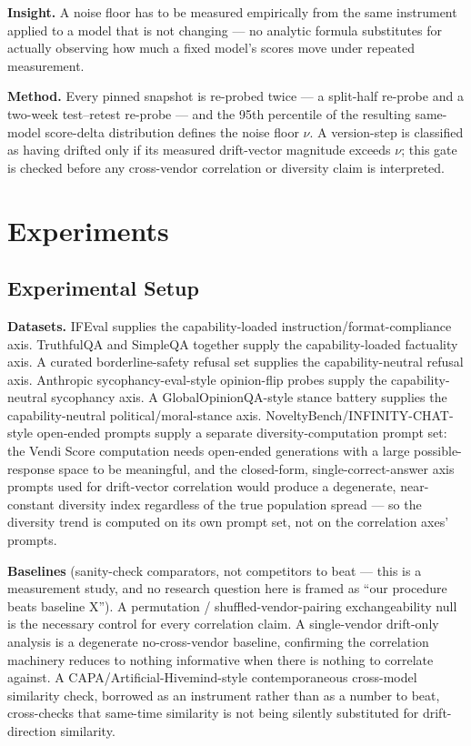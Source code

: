 \documentclass[11pt]{article}
\begin{document}
\textbf{Insight.} A noise floor has to be measured empirically from the same instrument applied to a model that is not changing --- no analytic formula substitutes for actually observing how much a fixed model's scores move under repeated measurement.

\textbf{Method.} Every pinned snapshot is re-probed twice --- a split-half re-probe and a two-week test--retest re-probe --- and the 95th percentile of the resulting same-model score-delta distribution defines the noise floor $\nu$. A version-step is classified as having drifted only if its measured drift-vector magnitude exceeds $\nu$; this gate is checked before any cross-vendor correlation or diversity claim is interpreted.

\section{Experiments}

\subsection{Experimental Setup}

\textbf{Datasets.} IFEval supplies the capability-loaded instruction/format-compliance axis. TruthfulQA and SimpleQA together supply the capability-loaded factuality axis. A curated borderline-safety refusal set supplies the capability-neutral refusal axis. Anthropic sycophancy-eval-style opinion-flip probes supply the capability-neutral sycophancy axis. A GlobalOpinionQA-style stance battery supplies the capability-neutral political/moral-stance axis. NoveltyBench/INFINITY-CHAT-style open-ended prompts supply a separate diversity-computation prompt set: the Vendi Score computation needs open-ended generations with a large possible-response space to be meaningful, and the closed-form, single-correct-answer axis prompts used for drift-vector correlation would produce a degenerate, near-constant diversity index regardless of the true population spread --- so the diversity trend is computed on its own prompt set, not on the correlation axes' prompts.

\textbf{Baselines} (sanity-check comparators, not competitors to beat --- this is a measurement study, and no research question here is framed as ``our procedure beats baseline X''). A permutation / shuffled-vendor-pairing exchangeability null is the necessary control for every correlation claim. A single-vendor drift-only analysis is a degenerate no-cross-vendor baseline, confirming the correlation machinery reduces to nothing informative when there is nothing to correlate against. A CAPA/Artificial-Hivemind-style contemporaneous cross-model similarity check, borrowed as an instrument rather than as a number to beat, cross-checks that same-time similarity is not being silently substituted for drift-direction similarity.
\end{document}
